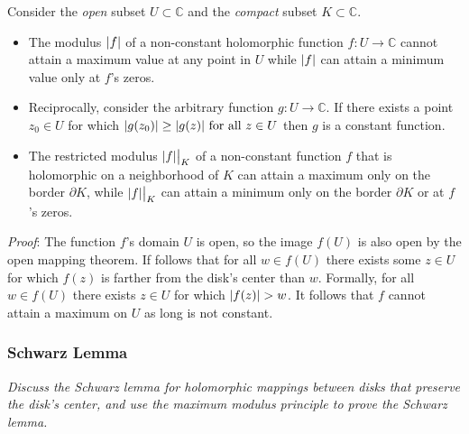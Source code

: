 \documentclass[11pt, a4paper]{article}
\newcommand{\question}[1]{\textit{#1}\vspace{2mm}}
\newcommand{\C}{\mathbb{C}} %
\begin{document}
Consider the \textit{open} subset $ U \subset \C $ and the \textit{compact} subset $ K \subset \C $.
\begin{itemize}
	\item The modulus $ \abs{f} $ of a non-constant holomorphic function $ f: U \to \C $ cannot attain a maximum value at any point in $ U $ while $ \abs{f} $ can attain a minimum value only at $ f $'s zeros.
	
	\item Reciprocally, consider the arbitrary function $ g:U\to \C $. If there exists a point $ z_0 \in U $ for which $ \displaystyle{\abs{g(z_0)} \geq \abs{g(z)} \ \text{for all} \ z \in U} $
	then $ g $ is a constant function.
	
	\item The restricted modulus $ \abs{f} \big |_{K} $ of a non-constant function $ f $ that is holomorphic on a neighborhood of $ K $ can attain a maximum only on the border $ \partial K $, while $ \abs{f} \big |_{K} $ can attain a minimum only on the border $ \partial K $ or at $ f $'s zeros.
\end{itemize}
\textit{Proof}: The function $ f $'s domain $ U $ is open, so the image $ f(U) $ is also open by the open mapping theorem. If follows that for all $ w \in f(U) $ there exists some $ z \in U $ for which $ f(z) $ is farther from the disk's center than $ w $. Formally, for all $ w \in f(U) $ there exists $ z \in U $ for which $ \abs{f(z)} > w $. It follows that $ f $ cannot attain a maximum on $ U $  as long is not constant.

	

		

\subsubsection{Schwarz Lemma}
\question{Discuss the Schwarz lemma for holomorphic mappings between disks that preserve the disk's center, and use the maximum modulus principle to prove the Schwarz lemma.}
\end{document}
